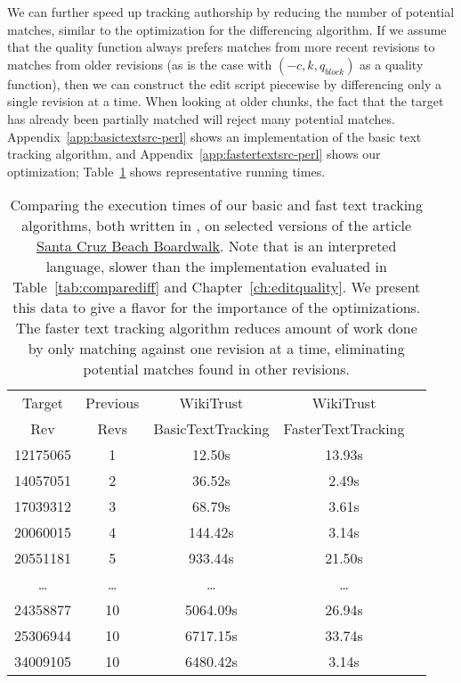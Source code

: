 We can further speed up tracking authorship by reducing the number
of potential matches, similar to the optimization for the differencing
algorithm.
If we assume that the quality function always prefers matches from
more recent revisions to matches from older revisions
(as is the case with $(-c, k, q_{block})$ as a quality function),
then we can construct the edit script piecewise by differencing
only a single revision at a time.
When looking at older chunks, the fact that the target has already
been partially matched will reject many potential matches.
Appendix~\ref{app:basictextsrc-perl} shows an implementation of the
basic text tracking algorithm, and Appendix~\ref{app:fastertextsrc-perl}
shows our optimization; Table~\ref{tab:comparetext} shows representative
running times.

\begin{table}
\begin{center}
\begin{tabular}{| c | c || c || c | c |}
\hline
Target & Previous & WikiTrust & WikiTrust \\
Rev & Revs & BasicTextTracking & FasterTextTracking \\
\hline
12175065 & 1 & 12.50s & 13.93s \\
14057051 & 2 & 36.52s & 2.49s \\
17039312 & 3 & 68.79s & 3.61s \\
20060015 & 4 & 144.42s & 3.14s \\
20551181 & 5 & 933.44s & 21.50s \\
\ldots & \ldots & \ldots & \ldots \\
24358877 & 10 & 5064.09s & 26.94s \\
25306944 & 10 & 6717.15s & 33.74s \\
34009105 & 10 & 6480.42s & 3.14s \\
\hline
\end{tabular}
\end{center}
\caption[Comparing execution times of our basic and
    faster text tracking algorithms.]{
    Comparing the execution times of our
    basic and fast text tracking
    algorithms, both written in \perl, on selected versions of the article
    \underline{Santa Cruz Beach Boardwalk}.
    Note that \perl is an interpreted language, slower than the
    \ocaml implementation evaluated in Table~\ref{tab:comparediff}
    and Chapter~\ref{ch:editquality}.
    We present this data to give a flavor for the importance
    of the optimizations.
    The faster text tracking algorithm reduces amount of work
    done by only matching against one revision at a time, eliminating
    potential matches found in other revisions.
}
\label{tab:comparetext}
\end{table}


